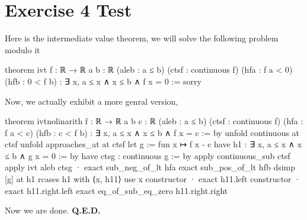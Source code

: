 \documentclass{article}
\begin{document}
\section{Exercise 4 Test}

Here is the intermediate value theorem, we will solve the following problem modulo it
\begin{lean}
theorem ivt {f : ℝ → ℝ} {a b : ℝ} (aleb : a ≤ b)
    (ctsf : continuous f) (hfa : f a < 0) (hfb : 0 < f b) :
  ∃ x, a ≤ x ∧ x ≤ b ∧ f x = 0 :=
sorry
\end{lean}

Now, we actually exhibit a more genral version,
\begin{lean}
theorem ivtnolinarith {f : ℝ → ℝ} {a b c : ℝ} (aleb : a ≤ b)
    (ctsf : continuous f) (hfa : f a < c) (hfb : c < f b) :
  ∃ x, a ≤ x ∧ x ≤ b ∧ f x = c := by
  unfold continuous at ctsf
  unfold approaches_at at ctsf
  let g := fun x ↦ f x - c
  have h1 : ∃ x, a ≤ x ∧ x ≤ b ∧ g x = 0 := by
    have ctsg : continuous g := by
      apply continuous_sub ctsf
    apply ivt aleb ctsg
    · exact sub_neg_of_lt hfa
    exact sub_pos_of_lt hfb
  dsimp [g] at h1
  rcases h1 with ⟨x, h11⟩
  use x
  constructor
  · exact h11.left
  constructor
  · exact h11.right.left
  exact eq_of_sub_eq_zero h11.right.right
\end{lean}

Now we are done. \textbf{Q.E.D.}
\end{document}
